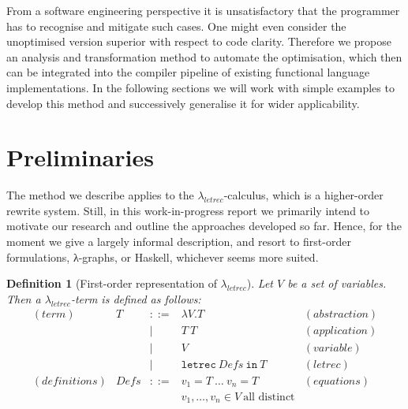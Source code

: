 \documentclass[submission,copyright,creativecommons]{eptcs}
\newtheorem{definition}[theorem]{Definition}
\newcommand{\lambdaletrec}{\ensuremath{\lambda_\textit{letrec}}}
\newcommand{\letrec}{\texttt{letrec}}
\newcommand{\beIn}{~\texttt{in}~}
\newcommand\sep[1]{&#1&}
\renewcommand\;{\,}
\begin{document}
From a software engineering perspective it is unsatisfactory that the
programmer has to recognise and mitigate such cases. One might even consider
the unoptimised version superior with respect to code
clarity. Therefore we propose an analysis and transformation method to automate
the optimisation, which then can be integrated into the compiler pipeline of
existing functional language implementations.
In the following sections we will work with simple examples to develop this
method and successively generalise it for wider applicability.






\section{Preliminaries}\label{sec:prelims}


The method we describe applies to the \lambdaletrec-calculus, which is a
higher-order rewrite system. Still, in this work-in-progress report we
primarily intend to motivate our research and outline the approaches developed
so far. Hence, for the moment we give a largely informal description, and
resort to first-order formulations, λ-graphs, or Haskell, whichever seems more suited.

\begin{definition}[First-order representation of $\lambdaletrec$]\normalfont Let $V$ be a set of variables. Then a \lambdaletrec-term is defined as follows:
\begin{equation*}
\begin{array}{lllll}
(\textit{term})        & T    \sep{::=} \lambda V.T         & (\textit{abstraction}) \\
                       &      \sep{ | } T~T                 & (\textit{application}) \\ 
                       &      \sep{ | } V                   & (\textit{variable})    \\
                       &      \sep{ | } \letrec~\mathit{Defs}\beIn T & (\textit{letrec})      \\
(\textit{definitions}) & \mathit{Defs} \sep{::=} v_1=T~\dots~v_n=T   & (\textit{equations})   \\
                       &      \sep{   } v_1,\dots,v_n \in V~\text{all distinct}
\end{array}
\end{equation*}
\end{definition}
\end{document}
